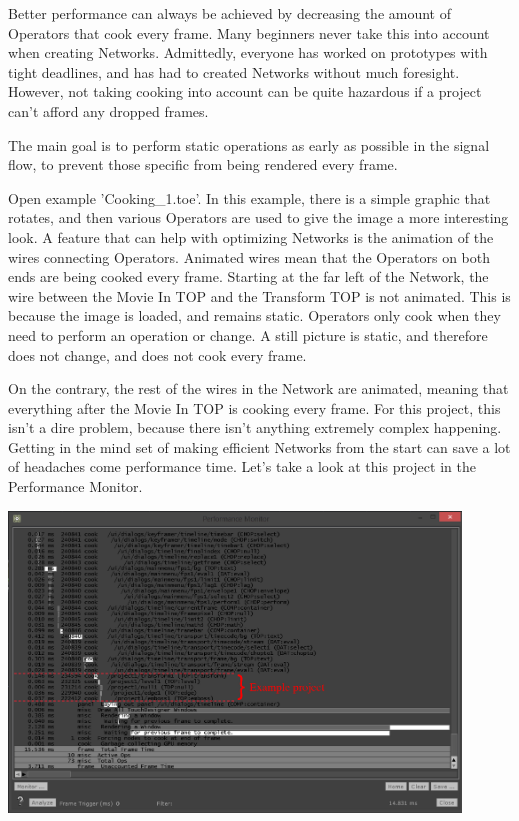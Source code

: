 \begin{fullwidth}
Better performance can always be achieved by decreasing the amount of Operators that cook every frame. Many beginners never take this into account when creating Networks. Admittedly, everyone has worked on prototypes with tight deadlines, and has had to created Networks without much foresight. However, not taking cooking into account can be quite hazardous if a project can't afford any dropped frames.

The main goal is to perform static operations as early as possible in the signal flow, to prevent those specific from being rendered every frame.

Open example 'Cooking\_1.toe'. In this example, there is a simple graphic that rotates, and then various Operators are used to give the image a more interesting look. A feature that can help with optimizing Networks is the animation of the wires connecting Operators. Animated wires mean that the Operators on both ends are being cooked every frame. Starting at the far left of the Network, the wire between the Movie In TOP and the Transform TOP is not animated. This is because the image is loaded, and remains static. Operators only cook when they need to perform an operation or change. A still picture is static, and therefore does not change, and does not cook every frame. 

On the contrary, the rest of the wires in the Network are animated, meaning that everything after the Movie In TOP is cooking every frame. For this project, this isn't a dire problem, because there isn't anything extremely complex happening. Getting in the mind set of making efficient Networks from the start can save a lot of headaches come performance time. Let's take a look at this project in the Performance Monitor. 

\begin{center}
\includegraphics[width=12cm]{./img/11.4/operator-cooking-1.png}
\end{center}


\end{fullwidth}
